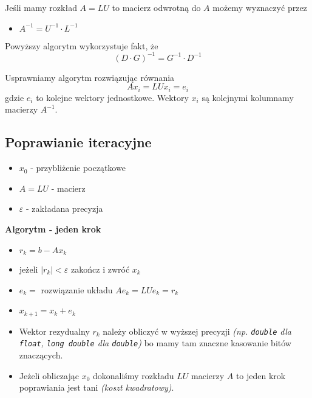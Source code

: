 \documentclass[../mn-notatki.tex]{subfiles}
\begin{document}
\begin{tcolorbox}
Jeśli mamy rozkład $A = LU$ to macierz odwrotną do $A$ możemy wyznaczyć przez
\begin{itemize}
    \item $A^{-1} = U^{-1} \cdot L^{-1}$
\end{itemize}
Powyższy algorytm wykorzystuje fakt, że
\[
(D\cdot G)^{-1} = G^{-1} \cdot D^{-1}
\]
\end{tcolorbox}

Usprawniamy algorytm rozwiązując równania
\[
Ax_i = LUx_i = e_i
\]
gdzie $e_i$ to kolejne wektory jednostkowe. Wektory $x_i$ są kolejnymi
kolumnamy macierzy $A^{-1}$.

\subsection{Poprawianie iteracyjne}

\begin{itemize}
    \item $x_0$ - przybliżenie początkowe
    \item $A = LU$ - macierz
    \item $\varepsilon$ - zakładana precyzja
\end{itemize}
\begin{tcolorbox}
\textbf{Algorytm - jeden krok}
\begin{itemize}
    \item $r_k = b - Ax_k$
    \item jeżeli $|r_k| < \varepsilon$ zakończ i zwróć $x_k$
    \item $e_k = $ rozwiązanie układu $Ae_k = LUe_k = r_k$
    \item $x_{k+1} = x_k + e_k$
\end{itemize}
\end{tcolorbox}

\begin{itemize}
    \item Wektor rezydualny $r_k$ należy obliczyć w wyższej precyzji
    \textit{(np. \texttt{double} dla \texttt{float}, \texttt{long double} dla
    \texttt{double})} bo mamy tam znaczne kasowanie bitów znaczących.
    \item Jeżeli obliczając $x_0$ dokonaliśmy rozkładu $LU$ macierzy $A$ to
    jeden krok poprawiania jest tani \textit{(koszt kwadratowy)}.
\end{itemize}


\pagebreak
\end{document}
